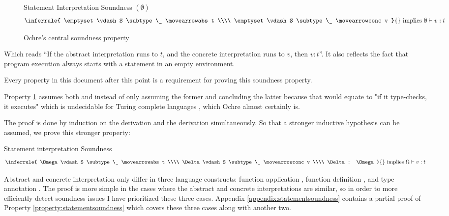 \documentclass[12pt,twoside]{report}
\begin{document}
\begin{figure}[H]
  \noindent
  \begin{Property}{Statement Interpretation Soundness $(\emptyset)$}{}
    \[
      \oimplies{
        \inferrule{
          \emptyset \vdash S \subtype \_ \movearrowabs t \\\\
          \emptyset \vdash S \subtype \_ \movearrowconc v
        }{}
      }{
        \emptyset \vdash v: t
      }
    \]
    \label{property:statementsoundnessempty}
  \end{Property}
  \caption{Ochre's central soundness property}
\end{figure}

Which reads ``If the abstract interpretation runs to $t$, and the concrete interpretation runs to $v$, then $v:t$''. It also reflects the fact that program execution always starts with a statement in an empty environment.

Every property in this document after this point is a requirement for proving this soundness property.

Property \ref{property:statementsoundnessempty} assumes both \movearrowabs and \movearrowconc instead of only assuming the former and concluding the latter because that would equate to "if it type-checks, it executes" which is undecidable for Turing complete languages \citep{turingComputableNumbersApplication1937}, which Ochre almost certainly is.

The proof is done by induction on the \movearrowabs derivation and the \movearrowconc derivation simultaneously. So that a stronger inductive hypothesis can be assumed, we prove this stronger property:

\begin{Property}{Statement interpretation Soundness}{}
  \[
    \oimplies{
      \inferrule{
      \Omega \vdash S \subtype \_ \movearrowabs t \\\\
      \Delta \vdash S \subtype \_ \movearrowconc v \\\\
      \Delta : \Omega
    }{}  
    }{
      \Omega \vdash v: t
    }
  \]
  \label{property:statementsoundness}
\end{Property}

Abstract and concrete interpretation only differ in three language constructs: function application , function definition , and type annotation . The proof is more simple in the cases where the abstract and concrete interpretations are similar, so in order to more efficiently detect soundness issues I have prioritized these three cases. Appendix \ref{appendix:statementsoundness} contains a partial proof of Property \ref{property:statementsoundness} which covers these three cases along with another two.
\end{document}

